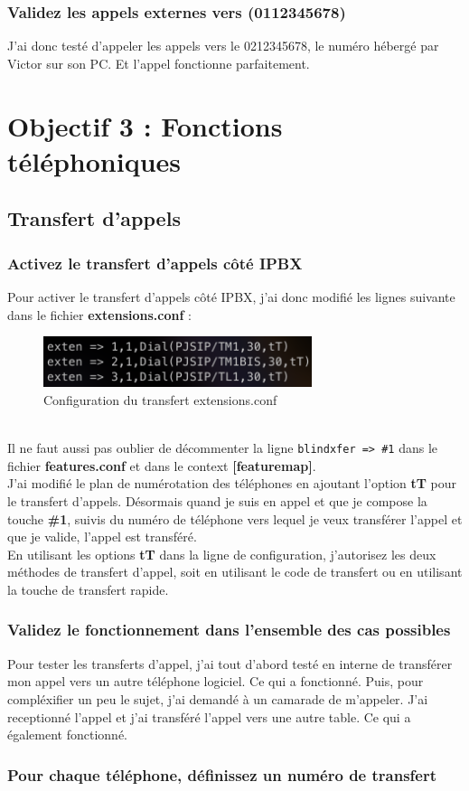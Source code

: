 \documentclass[12pt, a4paper]{article}
\begin{document}
	\subsubsection{Validez les appels externes vers (0112345678)}
	J'ai donc testé d'appeler les appels vers le 0212345678, le numéro hébergé par
	Victor sur son PC. Et l'appel fonctionne parfaitement. 

\newpage
\section{Objectif 3 : Fonctions téléphoniques}
\subsection{Transfert d'appels}
	\subsubsection{Activez le transfert d'appels côté IPBX}
	Pour activer le transfert d'appels côté IPBX, j'ai donc modifié les lignes suivante 
	dans le fichier \textbf{extensions.conf} :
	\begin{figure}[h]
		\centering
		\includegraphics[width=0.7\textwidth]{img/tT.png}
		\caption{Configuration du transfert extensions.conf}
		\label{fig:trans}
	\end{figure}\\
	Il ne faut aussi pas oublier de décommenter la ligne \texttt{blindxfer => \#1}
	dans le fichier \textbf{features.conf} et dans le context \textbf{[featuremap]}.\\

	J'ai modifié le plan de numérotation des téléphones en ajoutant l'option
	\textbf{tT} pour le transfert d'appels. Désormais quand je suis en appel
	et que je compose la touche \textbf{\#1}, suivis du numéro de téléphone
	vers lequel je veux transférer l'appel et que je valide, l'appel est transféré.\\

	En utilisant les options \textbf{tT} dans la ligne de configuration, j'autorisez 
	les deux méthodes de transfert d'appel, soit en utilisant le code de 
	transfert ou en utilisant la touche de transfert rapide.

	\subsubsection{Validez le fonctionnement dans l'ensemble des cas possibles}
	Pour tester les transferts d'appel, j'ai tout d'abord testé en interne de 
	transférer mon appel vers un autre téléphone logiciel. Ce qui a fonctionné.
	Puis, pour compléxifier un peu le sujet, j'ai demandé à un camarade 
	de m'appeler. J'ai receptionné l'appel et j'ai transféré l'appel vers
	une autre table. Ce qui a également fonctionné.\\

	\subsubsection*{Pour chaque téléphone, définissez un numéro de transfert}
\end{document}
